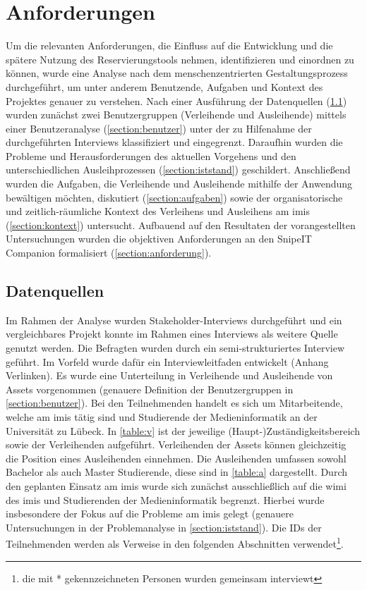 
\chapter{Anforderungen}
\label{chapter-analyse}

Um die relevanten Anforderungen, die Einfluss auf die Entwicklung und die spätere Nutzung des
Reservierungstools nehmen, identifizieren und einordnen zu können, wurde eine Analyse nach dem
menschenzentrierten Gestaltungsprozess durchgeführt, um unter anderem Benutzende, Aufgaben und
Kontext des Projektes genauer zu verstehen. Nach einer Ausführung der Datenquellen
(\ref{section:daten}) wurden zunächst zwei Benutzergruppen (Verleihende und Ausleihende) mittels
einer Benutzeranalyse (\ref{section:benutzer}) unter der zu Hilfenahme der durchgeführten Interviews
klassifiziert und eingegrenzt. Daraufhin wurden die Probleme und Herausforderungen des aktuellen
Vorgehens und den unterschiedlichen Ausleihprozessen (\ref{section:iststand}) geschildert.
Anschließend wurden die Aufgaben, die Verleihende und Ausleihende mithilfe der Anwendung bewältigen
möchten, diskutiert (\ref{section:aufgaben}) sowie der organisatorische und zeitlich-räumliche
Kontext des Verleihens und Ausleihens am \ac{imis} (\ref{section:kontext}) untersucht. Aufbauend auf
den Resultaten der vorangestellten Untersuchungen wurden die objektiven Anforderungen an den SnipeIT
Companion formalisiert (\ref{section:anforderung}).

\section{Datenquellen}
\label{section:daten}
Im Rahmen der Analyse wurden Stakeholder-Interviews durchgeführt und ein vergleichbares Projekt
konnte im Rahmen eines Interviews als weitere Quelle genutzt werden. Die Befragten wurden durch ein
semi-strukturiertes Interview geführt. Im Vorfeld wurde dafür ein Interviewleitfaden entwickelt
(Anhang Verlinken). Es wurde eine Unterteilung in Verleihende und Ausleihende von Assets vorgenommen
(genauere Definition der Benutzergruppen in \ref{section:benutzer}). Bei den Teilnehmenden handelt
es sich um Mitarbeitende, welche am \ac{imis} tätig sind und Studierende der Medieninformatik an der
Universität zu Lübeck. In \ref{table:v} ist der jeweilige (Haupt-)Zuständigkeitsbereich sowie der
Verleihenden aufgeführt. Verleihenden der Assets können gleichzeitig die Position eines Ausleihenden
einnehmen. Die Ausleihenden umfassen sowohl Bachelor als auch Master Studierende, diese sind in
\ref{table:a} dargestellt. Durch den geplanten Einsatz am \ac{imis} wurde sich zunächst
ausschließlich auf die \ac{wimi} des \ac{imis} und Studierenden der Medieninformatik begrenzt.
Hierbei wurde insbesondere der Fokus auf die Probleme am \ac*{imis} gelegt (genauere Untersuchungen
in der Problemanalyse in \ref{section:iststand}). Die IDs der Teilnehmenden werden als Verweise in
den folgenden Abschnitten verwendet\footnote{die mit * gekennzeichneten Personen wurden gemeinsam
        interviewt}.

